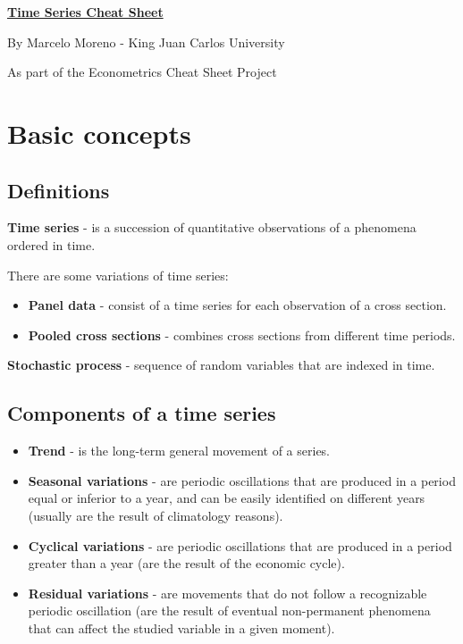 \documentclass[10pt, a4paper, landscape]{extarticle}
\begin{document}
\setlength{\footskip}{12pt}

\begin{multicols}{3}

\begin{center}
	\textbf{\LARGE \href{https://github.com/marcelomijas/econometrics-cheatsheet}{Time Series Cheat Sheet}}

	{\footnotesize By Marcelo Moreno - King Juan Carlos University}

	{\footnotesize As part of the Econometrics Cheat Sheet Project}
\end{center}

\section*{Basic concepts}

\subsection*{Definitions}

\textbf{Time series} - is a succession of quantitative observations of a phenomena ordered in time.

There are some variations of time series:

\begin{itemize}[leftmargin=*]
	\item \textbf{Panel data} - consist of a time series for each observation of a cross section.
	\item \textbf{Pooled cross sections} - combines cross sections from different time periods.
\end{itemize}

\textbf{Stochastic process} - sequence of random variables that are indexed in time.

\subsection*{Components of a time series}

\begin{itemize}[leftmargin=*]
	\item \textbf{Trend} - is the long-term general movement of a series.
	\item \textbf{Seasonal variations} - are periodic oscillations that are produced in a period equal or inferior to a year, and can be easily identified on different years (usually are the result of climatology reasons).
	\item \textbf{Cyclical variations} - are periodic oscillations that are produced in a period greater than a year (are the result of the economic cycle).
	\item \textbf{Residual variations} - are movements that do not follow a recognizable periodic oscillation (are the result of eventual non-permanent phenomena that can affect the studied variable in a given moment).
\end{itemize}


\end{multicols}
\end{document}
